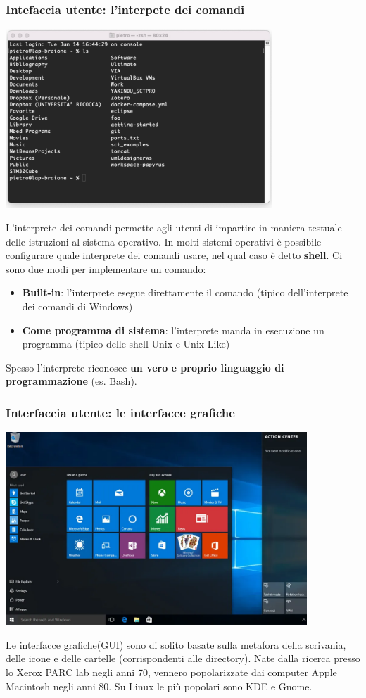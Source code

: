 \documentclass[12pt]{article}
\begin{document}
\subsubsection{Intefaccia utente: l'interpete dei comandi}
\begin{center}
    \includegraphics[width = 0.75\textwidth]{Images/6.PNG}
\end{center}
L'interprete dei comandi permette agli utenti di impartire in maniera testuale delle istruzioni al sistema operativo.
In molti sistemi operativi è possibile configurare quale interprete dei comandi usare, nel qual caso è detto \textbf{shell}.
Ci sono due modi per implementare un comando:
\begin{itemize}
    \item \textbf{Built-in}: l'interprete esegue direttamente il comando (tipico dell'interprete dei comandi di Windows)
    \item \textbf{Come programma di sistema}: l'interprete manda in esecuzione un programma (tipico delle shell Unix e Unix-Like)
\end{itemize}
Spesso l'interprete riconosce \textbf{un vero e proprio linguaggio di programmazione} (es. Bash).
\subsubsection{Interfaccia utente: le interfacce grafiche}
\begin{center}
    \includegraphics[width = 0.85\textwidth]{Images/7.PNG}
\end{center}
Le interfacce grafiche(GUI) sono di solito basate sulla metafora della scrivania, delle icone e delle cartelle (corrispondenti alle directory).
Nate dalla ricerca presso lo Xerox PARC lab negli anni 70, vennero popolarizzate dai computer Apple Macintosh negli anni 80. Su Linux le più popolari sono KDE e Gnome.
\newpage
\end{document}
